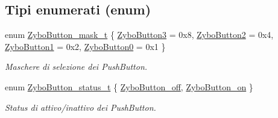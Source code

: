 \subsection*{Tipi enumerati (enum)}
\begin{DoxyCompactItemize}
\item 
enum \hyperlink{group___zybo_button_ga4d26a5f6cad606de534ba034e0ba42dd}{Zybo\+Button\+\_\+mask\+\_\+t} \{ \hyperlink{group___zybo_button_gga4d26a5f6cad606de534ba034e0ba42ddaabede392be8cae14b8a070a804c754e8}{Zybo\+Button3} = 0x8, 
\hyperlink{group___zybo_button_gga4d26a5f6cad606de534ba034e0ba42dda2aa888c8f01ac8a79013e5ebc9eef609}{Zybo\+Button2} = 0x4, 
\hyperlink{group___zybo_button_gga4d26a5f6cad606de534ba034e0ba42dda29c35ef3133898c050f675a60de66dd7}{Zybo\+Button1} = 0x2, 
\hyperlink{group___zybo_button_gga4d26a5f6cad606de534ba034e0ba42dda2f821ce9661687aefb0ec4de65911570}{Zybo\+Button0} = 0x1
 \}
\begin{DoxyCompactList}\small\item\em Maschere di selezione dei Push\+Button. \end{DoxyCompactList}\item 
enum \hyperlink{group___zybo_button_ga85c290bfa232cab213e69200bf78e06a}{Zybo\+Button\+\_\+status\+\_\+t} \{ \hyperlink{group___zybo_button_gga85c290bfa232cab213e69200bf78e06aacd110f28912806bcec929721e8737399}{Zybo\+Button\+\_\+off}, 
\hyperlink{group___zybo_button_gga85c290bfa232cab213e69200bf78e06aa49bf4a6902270f28bc6a1146fbd1b1fe}{Zybo\+Button\+\_\+on}
 \}
\begin{DoxyCompactList}\small\item\em Status di attivo/inattivo dei Push\+Button. \end{DoxyCompactList}\end{DoxyCompactItemize}

